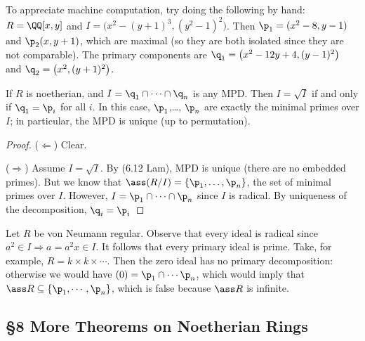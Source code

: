  \begin{example}
  To appreciate machine computation, try doing the following by hand: $R=\QQ[x,y]$ and
  $I=\bigl(x^2-(y+1)^3,(y^2-1)^2\bigr)$. Then $\p_1=(x^2-8,y-1)$ and $\p_2(x,y+1)$, which
  are maximal (so they are both isolated since they are not comparable). The primary
  components are $\q_1=\bigl(x^2-12y+4,(y-1)^2\bigr)$ and $\q_2=\bigl( x^2 ,
  (y+1)^2\bigr)$.
 \end{example}

 \begin{theorem}
   If $R$ is noetherian, and $I=\q_1\cap \cdots\cap \q_n$ is any MPD. Then $I=\sqrt I$ if
   and only if $\q_1=\p_i$ for all $i$. In this case, $\p_1$,\dots, $\p_n$ are exactly
   the minimal primes over $I$; in particular, the MPD is unique (up to permutation).
 \end{theorem}
 \begin{proof}
   ($\Leftarrow$) Clear.

   ($\Rightarrow$) Assume $I=\sqrt I$. By (6.12 Lam), MPD is unique (there are no
   embedded primes). But we know that $\ass(R/I)=\{\p_1,\dots, \p_n\}$, the set of
   minimal primes over $I$. However, $I=\p_1\cap\cdots \cap \p_n$ since $I$ is radical.
   By uniqueness of the decomposition, $\q_i=\p_i$
 \end{proof}
 \begin{remark}
   Let $R$ be von Neumann regular. Observe that every ideal is radical since $a^2\in
   I\Rightarrow a=a^2x\in I$. It follows that every primary ideal is prime. Take, for
   example, $R=k\times k\times \cdots$. Then the zero ideal has no primary decomposition:
   otherwise we would have $(0)=\p_1\cap \cdots \p_n$, which would imply that $\ass
   R\subseteq \{\p_1,\cdots, \p_n\}$, which is false because $\ass R$ is infinite.
 \end{remark}

 \subsection{\S 8 More Theorems on Noetherian Rings}


